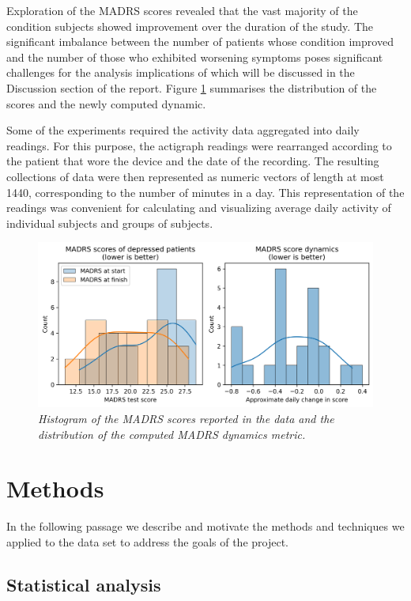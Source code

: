 \documentclass[12pt]{article}
\begin{document}
Exploration of the MADRS scores revealed that the vast majority of the condition subjects showed improvement over the duration of the study. The significant imbalance between the number of patients whose condition improved and the number of those who exhibited worsening symptoms poses significant challenges for the analysis implications of which will be discussed in the Discussion section of the report. Figure \ref{fig:madrs} summarises the distribution of the scores and the newly computed dynamic.

Some of the experiments required the activity data aggregated into daily readings. For this purpose, the actigraph readings were rearranged according to the patient that wore the device and the date of the recording. The resulting collections of data were then represented as numeric vectors of length at most 1440, corresponding to the number of minutes in a day. This representation of the readings was convenient for calculating and visualizing average daily activity of individual subjects and groups of subjects.

\begin{figure}[!h]
    \centering
    \includegraphics[width=.99\textwidth]{images/madrs.png}
    \captionsetup{justification=centering}
    \caption{\textit{Histogram of the MADRS scores reported in the data and the distribution of the computed MADRS dynamics metric.}}
    \label{fig:madrs}
\end{figure}

\section{Methods}

In the following passage we describe and motivate the methods and techniques we applied to the data set to address the goals of the project.

\subsection{Statistical analysis}
\end{document}
